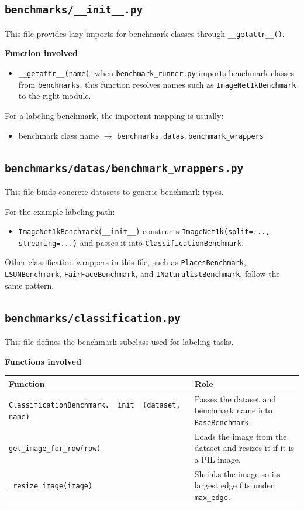 \documentclass[11pt]{article}
\begin{document}
\subsection*{\texttt{benchmarks/\_\_init\_\_.py}}
This file provides lazy imports for benchmark classes through \texttt{\_\_getattr\_\_()}.

\textbf{Function involved}
\begin{itemize}[leftmargin=*]
    \item \texttt{\_\_getattr\_\_(name)}: when \texttt{benchmark\_runner.py} imports benchmark classes from \texttt{benchmarks}, this function resolves names such as \texttt{ImageNet1kBenchmark} to the right module.
\end{itemize}

For a labeling benchmark, the important mapping is usually:
\begin{itemize}[leftmargin=*]
    \item benchmark class name $\rightarrow$ \texttt{benchmarks.datas.benchmark\_wrappers}
\end{itemize}

\subsection*{\texttt{benchmarks/datas/benchmark\_wrappers.py}}
This file binds concrete datasets to generic benchmark types.

For the example labeling path:
\begin{itemize}[leftmargin=*]
    \item \texttt{ImageNet1kBenchmark(\_\_init\_\_)} constructs \texttt{ImageNet1k(split=..., streaming=...)} and passes it into \texttt{ClassificationBenchmark}.
\end{itemize}

Other classification wrappers in this file, such as \texttt{PlacesBenchmark}, \texttt{LSUNBenchmark}, \texttt{FairFaceBenchmark}, and \texttt{INaturalistBenchmark}, follow the same pattern.

\subsection*{\texttt{benchmarks/classification.py}}
This file defines the benchmark subclass used for labeling tasks.

\textbf{Functions involved}
\begin{longtable}{>{\ttfamily}p{}p{}}
\textnormal{Function} & \textnormal{Role} \\
\hline
\texttt{ClassificationBenchmark.\_\_init\_\_(dataset, name)} & Passes the dataset and benchmark name into \texttt{BaseBenchmark}. \\
\texttt{get\_image\_for\_row(row)} & Loads the image from the dataset and resizes it if it is a PIL image. \\
\texttt{\_resize\_image(image)} & Shrinks the image so its largest edge fits under \texttt{max\_edge}. \\
\end{longtable}
\end{document}
